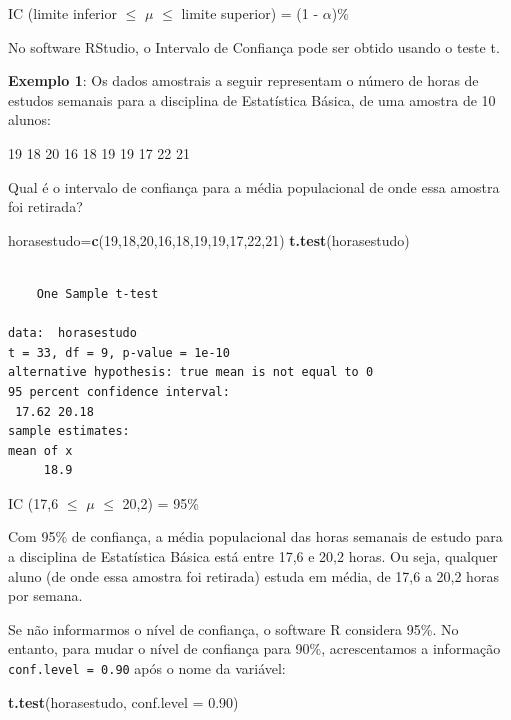 \documentclass[12pt,portuguese,oneside]{book}
\newenvironment{Shaded}{\begin{snugshade}}{\end{snugshade}}
\newcommand{\KeywordTok}[1]{\textcolor[rgb]{0.13,0.29,0.53}{\textbf{#1}}}
\newcommand{\DataTypeTok}[1]{\textcolor[rgb]{0.13,0.29,0.53}{#1}}
\newcommand{\DecValTok}[1]{\textcolor[rgb]{0.00,0.00,0.81}{#1}}
\newcommand{\FloatTok}[1]{\textcolor[rgb]{0.00,0.00,0.81}{#1}}
\newcommand{\NormalTok}[1]{#1}
\begin{document}
IC (limite inferior \(\leq\) \(\mu\) \(\leq\) limite superior) = (1 -
\(\alpha\))\%

No software RStudio, o Intervalo de Confiança pode ser obtido usando o
teste t.

\textbf{Exemplo 1}: Os dados amostrais a seguir representam o número de
horas de estudos semanais para a disciplina de Estatística Básica, de
uma amostra de 10 alunos:

19 18 20 16 18 19 19 17 22 21

Qual é o intervalo de confiança para a média populacional de onde essa
amostra foi retirada?

\begin{Shaded}
\begin{Highlighting}[]
\NormalTok{horasestudo=}\KeywordTok{c}\NormalTok{(}\DecValTok{19}\NormalTok{,}\DecValTok{18}\NormalTok{,}\DecValTok{20}\NormalTok{,}\DecValTok{16}\NormalTok{,}\DecValTok{18}\NormalTok{,}\DecValTok{19}\NormalTok{,}\DecValTok{19}\NormalTok{,}\DecValTok{17}\NormalTok{,}\DecValTok{22}\NormalTok{,}\DecValTok{21}\NormalTok{)}
\KeywordTok{t.test}\NormalTok{(horasestudo)}
\end{Highlighting}
\end{Shaded}

\begin{verbatim}

    One Sample t-test

data:  horasestudo
t = 33, df = 9, p-value = 1e-10
alternative hypothesis: true mean is not equal to 0
95 percent confidence interval:
 17.62 20.18
sample estimates:
mean of x 
     18.9 
\end{verbatim}

IC (17,6 \(\leq\) \(\mu\) \(\leq\) 20,2) = 95\%

Com 95\% de confiança, a média populacional das horas semanais de estudo
para a disciplina de Estatística Básica está entre 17,6 e 20,2 horas. Ou
seja, qualquer aluno (de onde essa amostra foi retirada) estuda em
média, de 17,6 a 20,2 horas por semana.

Se não informarmos o nível de confiança, o software R considera 95\%. No
entanto, para mudar o nível de confiança para 90\%, acrescentamos a
informação \texttt{conf.level\ =\ 0.90} após o nome da variável:

\begin{Shaded}
\begin{Highlighting}[]
\KeywordTok{t.test}\NormalTok{(horasestudo, }\DataTypeTok{conf.level =} \FloatTok{0.90}\NormalTok{)}
\end{Highlighting}
\end{Shaded}
\end{document}
